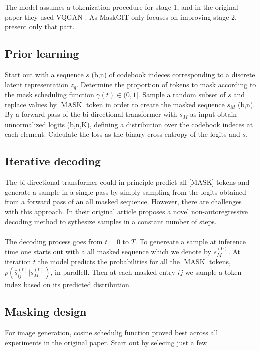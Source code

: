 \documentclass[../../thesis.tex]{subfiles}
\begin{document}
The model assumes a tokenization procedure for stage 1, and in the original paper they used VQGAN \cite{VQGAN}. As MaskGIT only focuses on improving stage 2, present only that part. 

\subsection{Prior learning}

Start out with a sequence $s$ (b,n) of codebook indeces corresponding to a discrete latent representation $z_q$. Determine the proportion of tokens to mask according to the mask scheduling function $\gamma(t)\in (0,1]$. 
Sample a random subset of $s$ and replace values by [MASK] token in order to create the masked sequence $s_M$ (b,n). By a forward pass of the bi-directional transformer with $s_M$ as input obtain unnormalized logits (b,n,K), defining a distribution over the codebook indeces at each element. Calculate the loss as the binary cross-entropy of the logits and $s$. 

\subsection{Iterative decoding}

The bi-directional transformer could in principle predict all [MASK] tokens and generate a sample in a single pass by simply sampling from the logits obtained from a forward pass of an all masked sequence. However, there are challenges with this approach. In their original article  \cite{chang2022maskgit} proposes a novel non-autoregressive decoding method to sythesize samples in a constant number of steps.\\\\

The decoding process goes from $t = 0$ to $T$. To genereate a sample at inference time one starts out with a all masked sequence which we denote by $s_M^{(0)}$. At iteration $t$ the model predicts the probabilities for all the [MASK] tokens, $p(\hat{s}_{ij}^{(t)}|s_M^{(t)})$, in parallell. Then at each masked entry $ij$ we sample a token index based on its predicted distribution.  

\subsection{Masking design}

For image generation, cosine schedulig function proved best across all experiments in the original paper. Start out by selecing just a few 
\end{document}
